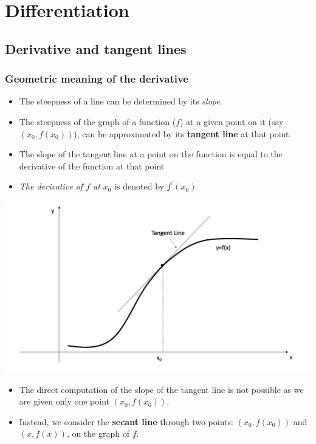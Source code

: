 \documentclass[]{book}
\providecommand{\tightlist}{%
  \setlength{\itemsep}{0pt}\setlength{\parskip}{0pt}}
\begin{document}
\newpage

\hypertarget{differentiation}{%
\section{Differentiation}\label{differentiation}}

\hypertarget{derivative-and-tangent-lines}{%
\subsection{Derivative and tangent lines}\label{derivative-and-tangent-lines}}

\hypertarget{geometric-meaning-of-the-derivative}{%
\subsubsection{Geometric meaning of the derivative}\label{geometric-meaning-of-the-derivative}}

\begin{itemize}
\tightlist
\item
  The steepness of a line can be determined by its \emph{slope}.
\item
  The steepness of the graph of a function (\(f\)) at a given point on it (say \((x_0, f{(x_0)})\)), can be approximated by its \textbf{tangent line} at that point.
\item
  The slope of the tangent line at a point on the function is equal to the derivative of the function at that point
\item
  \emph{The derivative of \(f\) at \(x_0\)} is denoted by \(f^\prime (x_0)\)
\end{itemize}

\begin{center}\includegraphics[width=0.7\linewidth]{figure/5Derivatives-1} \end{center}

\begin{itemize}
\tightlist
\item
  The direct computation of the slope of the tangent line is not possible as we are given only one point \((x_0, f{(x_0)})\).
\item
  Instead, we consider the \textbf{secant line} through two points: \((x_0, f{(x_0)})\) and \((x, f{(x)})\), on the graph of \(f\).
\end{itemize}
\end{document}
